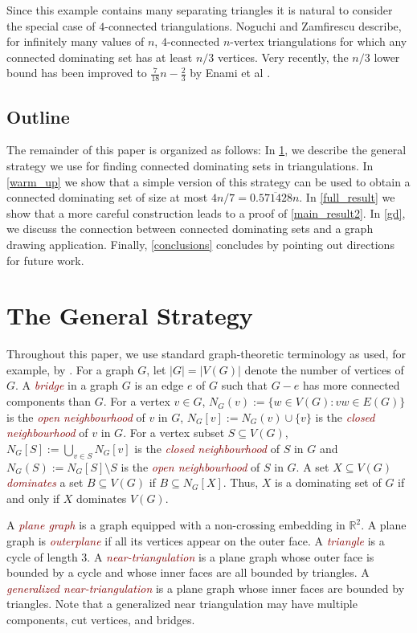 \documentclass[a4paper,UKenglish, cleveref, autoref, thm-restate]{lipics-v2021}
\newcommand{\defin}[1]{\emph{\textcolor{Maroon}{#1}}}
\begin{document}
Since this example contains many separating triangles it is natural to consider the special case of $4$-connected triangulations.  Noguchi and Zamfirescu \cite{noguchi.zamfirescu:spanning} describe, for infinitely many values of $n$, $4$-connected $n$-vertex triangulations for which any connected dominating set has at least $n/3$ vertices.  Very recently, the $n/3$ lower bound has been improved to  $\frac{7}{18}n - \frac{2}{3}$ by Enami et al \cite{enami2025contributionsconjecturesplanargraphs}. 

\subsection{Outline}

The remainder of this paper is organized as follows:  In \cref{strategy}, we describe the general strategy we use for finding connected dominating sets in triangulations.  In \cref{warm_up} we show that a simple version of this strategy can be used to obtain a connected dominating set of size at most $4n/7= 0.\overline{571428}n$. In \cref{full_result} we show that a more careful construction leads to a proof of \cref{main_result2}. In \cref{gd}, we discuss the connection between connected dominating sets and a graph drawing application. Finally, \cref{conclusions} concludes by pointing out directions for future work.

\section{The General Strategy}
\label{strategy}

Throughout this paper, we use standard graph-theoretic terminology as used, for example, by \cite{diestel:graph}.
For a graph $G$, let $|G|=|V(G)|$ denote the number of vertices of $G$.  A \defin{bridge} in a graph $G$ is an edge $e$ of $G$ such that $G-e$ has more connected components than $G$.  For a vertex $v\in G$, $N_G(v):=\{w\in V(G):vw\in E(G)\}$ is the \defin{open neighbourhood} of $v$ in $G$,  $N_G[v]:=N_G(v)\cup\{v\}$ is the \defin{closed neighbourhood} of $v$ in $G$.  For a vertex subset $S\subseteq V(G)$, $N_G[S]:=\bigcup_{v\in S} N_{G}[v]$ is the \defin{closed neighbourhood} of $S$ in $G$ and $N_G(S):=N_G[S]\setminus S$ is the \defin{open neighbourhood} of $S$ in $G$.  A set $X\subseteq V(G)$ \defin{dominates} a set $B\subseteq V(G)$ if $B\subseteq N_G[X]$.  Thus, $X$ is a dominating set of $G$ if and only if $X$ dominates $V(G)$.

A \defin{plane graph} is a graph equipped with a non-crossing embedding in $\mathbb{R}^2$.  A plane graph is \defin{outerplane} if all its vertices appear on the outer face.  A \defin{triangle} is a cycle of length $3$. A \defin{near-triangulation} is a plane graph whose outer face is bounded by a cycle and whose inner faces are all bounded by triangles.  A \defin{generalized near-triangulation} is a plane graph whose inner faces are bounded by triangles. Note that a generalized near triangulation may have multiple components, cut vertices, and bridges.
\end{document}
